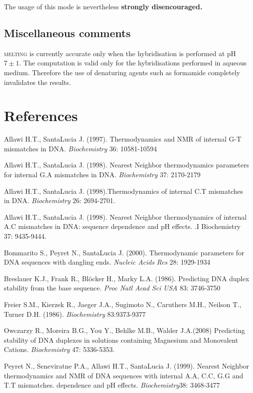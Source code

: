 \documentclass{article}
\begin{document}
  The usage of this mode is nevertheless  \textbf{strongly disencouraged.}   
   
\subsection{Miscellaneous comments }  
\textsc{melting} is currently accurate only when the hybridisation is performed
at pH $7\pm 1$.  The computation is valid only for the hybridisations performed
in aqueous medium. Therefore the use of denaturing agents such as formamide
completely invalidates the results.
   
\section{References }
Allawi 
H.T., SantaLucia J. (1997). Thermodynamics and NMR of internal G-T mismatches 
in DNA. \textit{Biochemistry}  36: 10581-10594   

Allawi H.T., SantaLucia J. (1998). Nearest Neighbor thermodynamics parameters 
for internal G.A mismatches in DNA. \textit{Biochemistry} 37: 2170-2179

Allawi H.T., SantaLucia J. (1998).Thermodynamics of internal C.T mismatches in DNA.
\textit{Biochemistry} 26: 2694-2701.

Allawi H.T., SantaLucia J. (1998). Nearest Neighbor thermodynamics of internal 
A.C mismatches in DNA: sequence dependence and pH effects.
.I Biochemistry 
37: 9435-9444.

Bommarito S., Peyret N., SantaLucia J. (2000).  Thermodynamic parameters for DNA
sequences with dangling ends.  \textit{Nucleic Acids Res} 28: 1929-1934

  Breslauer K.J., Frank R., Bl\"ocker 
H., Marky L.A. (1986). Predicting DNA duplex stability from the base sequence. 
 \textit{Proc Natl Acad Sci USA}  83: 3746-3750   

  Freier S.M., Kierzek R., Jaeger 
J.A., Sugimoto N., Caruthers M.H., Neilson T., Turner D.H. (1986). \textit{Biochemistry} 
 83:9373-9377 
 
 Owczarzy R., Moreira B.G., You Y., Behlke M.B., Walder J.A.(2008) Predicting stability of DNA duplexes 
 in solutions containing Magnesium and Monovalent Cations. \textit{Biochemistry} 47: 5336-5353.  

Peyret N., Seneviratne P.A., Allawi H.T., SantaLucia J. (1999). Nearest Neighbor thermodynamics and 
NMR of DNA sequences with internal A.A, C.C, G.G and T.T mismatches. dependence and pH effects.
\textit{Biochemistry}38: 3468-3477
\end{document}

